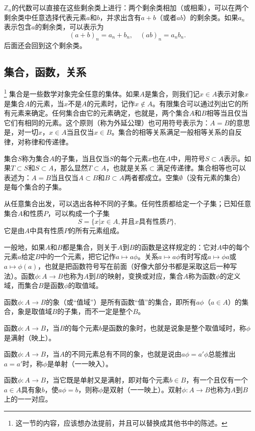 $\mathbb{Z}_n$的代数可以直接在这些剩余类上进行：两个剩余类相加（或相乘），可以在两个剩余类中任意选择代表元素$a$和$b$，并求出含有$a+b$（或者$ab$）的剩余类。如果$a_n$表示包含$a$的剩余类，可以表示为
\[
(a+b)_n = a_n + b_n, \quad (ab)_n = a_nb_n.
\]
后面还会回到这个剩余类。

\subsection{集合，函数，关系}\footnote{这一节的内容，应该想办法提前，并且可以替换成其他书中的陈述。}
集合是一些数学对象完全任意的集体。如果$A$是集合，则我们记$x \in A$表示对象$x$是集合$A$的元素，当$x$不是$A$的元素时，记作$x \not\in A$。有限集合可以通过列出它的所有元素来确定。任何集合由它的元素确定，也就是，两个集合$A$和$B$相等当且仅当它们有相同的元素。这个原则（称为外延公理）也可用符号表示为：$A=B$的意思是，对一切$x$，$x \in A$当且仅当$x \in B$。集合的相等关系满足一般相等关系的自反律，对称律和传递律。

集合$S$称为集合$A$的子集，当且仅当$S$的每个元素$x$也在$A$中，用符号$S \subset A$表示。如果$T \subset S$和$S \subset A$，那么显然$T \subset A$，也就是关系$\subset$满足传递律。集合相等也可以表述为：$A=B$当且仅当$A \subset B$和$B \subset A$两者都成立。空集$\emptyset$（没有元素的集合）是每个集合的子集。

从任意集合出发，可以选出各种不同的子集。任何性质都给定一个子集；已知任意集合$A$和性质$P$，可以构成一个子集
\[
S = \{x | x \in A, \text{并且}x\text{具有性质}P\},
\]
它是由$A$中具有性质$P$的所有元素组成。

一般地，如果$A$和$B$都是集合，则关于$A$到$B$的函数是这样规定的：它对$A$中的每个元素$a$给定$B$中的一个元素，把它记作$a \mapsto a\phi$。关系$a \mapsto a\phi$有时写成$a \mapsto \phi{}a$或$a \mapsto \phi(a)$，也就是把函数符号写在前面（好像大部分书都是采取这后一种写法）。函数$\phi: A \to B$也称为$A$到$B$的映射，变换或对应，集合$A$称为函数$\phi$的定义域，而集合$B$是函数$\phi$的取值域。

函数$\phi: A \to B$的象（或“值域”）是所有函数“值”的集合，即所有$a\phi$（$a \in A$）的集合，象是取值域$B$的子集，而不一定是整个$B$。

函数$\phi:A \to B$，当$B$的每个元素$b$是函数的象时，也就是说象是整个取值域时，称$\phi$是满射（映上）。

函数$\phi:A \to B$，当$A$的不同元素总有不同的象，也就是说由$a\phi=a'\phi$总能推出$a=a'$时，称$\phi$是单射（一一映入）。

函数$\phi:A \to B$，当它既是单射又是满射，即对每个元素$b \in B$，有一个且仅有一个$a \in A$具有象$b$，使$a\phi = b$，则称$\phi$是双射（一一映上）。双射$\phi:A \to B$也称为$A$到$B$上的一一对应。

